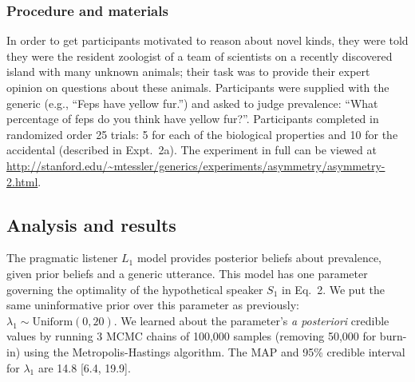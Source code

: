 \documentclass[12pt,letterpaper]{article}
\begin{document}
\subsubsection*{Procedure and materials}

In order to get participants motivated to reason about novel kinds, they were told they were the resident zoologist of a team of scientists on a recently discovered island with many unknown animals; their task was to provide their expert opinion on questions about these animals.
Participants were supplied with the generic (e.g., ``Feps have yellow fur.'') and asked to judge prevalence: ``What percentage of feps do you think have yellow fur?''. 
Participants completed in randomized order 25 trials: 5 for each of the biological properties and 10 for the accidental (described in Expt.~2a).
The experiment in full can be viewed at \url{http://stanford.edu/~mtessler/generics/experiments/asymmetry/asymmetry-2.html}. 

\subsection*{Analysis and results}

The pragmatic listener $L_1$ model provides posterior beliefs about prevalence, given prior beliefs and a generic utterance.
This model has one parameter governing the optimality of the hypothetical speaker $S_1$ in Eq.~2. 
We put the same uninformative prior over this parameter as previously: $\lambda_1 \sim \text{Uniform}(0, 20)$.
We learned about the parameter's \emph{a posteriori} credible values by running 3 MCMC chains of 100,000 samples (removing 50,000 for burn-in) using the Metropolis-Hastings algorithm.
The MAP and 95\% credible interval for $\lambda_1$ are 14.8 [6.4, 19.9].
\end{document}
